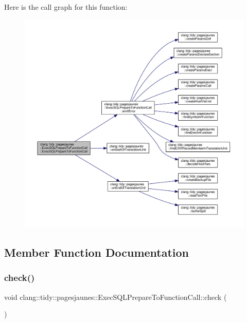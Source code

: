 Here is the call graph for this function\+:
\nopagebreak
\begin{figure}[H]
\begin{center}
\leavevmode
\includegraphics[width=350pt]{classclang_1_1tidy_1_1pagesjaunes_1_1_exec_s_q_l_prepare_to_function_call_a7075e59992f7f1c53938e30d7f6831e5_cgraph}
\end{center}
\end{figure}


\subsection{Member Function Documentation}
\mbox{\label{classclang_1_1tidy_1_1pagesjaunes_1_1_exec_s_q_l_prepare_to_function_call_a113ff5dac44508cad49d6ae7e9688008}} 
\subsubsection{\texorpdfstring{check()}{check()}}
{\footnotesize\ttfamily void clang\+::tidy\+::pagesjaunes\+::\+Exec\+S\+Q\+L\+Prepare\+To\+Function\+Call\+::check (\begin{DoxyParamCaption}\item[{const ast\+\_\+matchers\+::\+Match\+Finder\+::\+Match\+Result \&}]{ }\end{DoxyParamCaption})\hspace{0.3cm}{\ttfamily [override]}}



